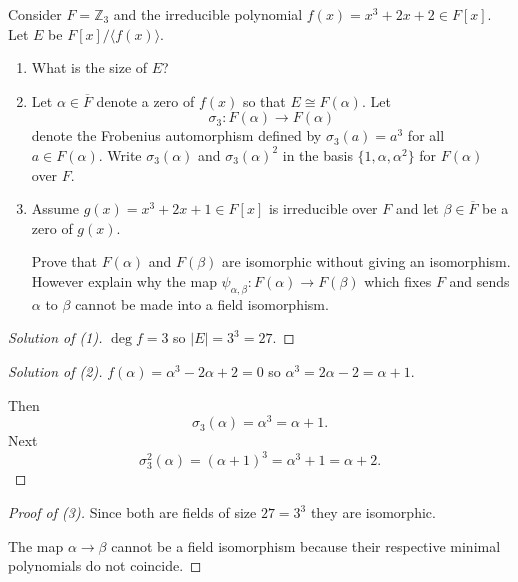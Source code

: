 \begin{prob}
    Consider $F = \mathbb Z_3$ and the irreducible polynomial 
    $f(x) = x^3 + 2x + 2 \in F[x]$.
    Let $E$ be $F[x]/\langle f(x) \rangle$.
    \begin{enumerate}
        \item What is the size of $E$?
        \item Let $\alpha \in \overline F$ denote a zero of 
            $f(x)$ so that $E \cong F(\alpha)$. Let 
            \[
                \sigma_3 : F(\alpha) \to F(\alpha)
            \]
            denote the Frobenius automorphism defined by 
            $\sigma_3(a) = a^3$ for all $a \in F(\alpha)$.
            Write $\sigma_3(\alpha)$ and $\sigma_3(\alpha)^2$ in the 
            basis $\{1,\alpha,\alpha^2\}$ for $F(\alpha)$ over 
            $F$.
        \item Assume $g(x) = x^3 + 2x + 1 \in F[x]$ is irreducible 
            over $F$ and let $\beta \in \overline F$ be a zero of 
            $g(x)$.

            Prove that $F(\alpha)$ and $F(\beta)$ are isomorphic 
            without giving an isomorphism. However explain why 
            the map $\psi_{\alpha,\beta} : F(\alpha) \to F(\beta)$
            which fixes $F$ and sends $\alpha$ to $\beta$ cannot 
            be made into a field isomorphism.
    \end{enumerate}

\end{prob}
\begin{proof}[Solution of (1)]
    $\deg f = 3$ so $|E| = 3^3 = 27$.
\end{proof}
\begin{proof}[Solution of (2)]  
    $f(\alpha) = \alpha^3 - 2 \alpha + 2 = 0$ so 
    $\alpha^3 = 2\alpha - 2 = \alpha + 1$.

    Then 
    \[
        \sigma_3(\alpha) = \alpha^3 = \alpha + 1.
    \]
    Next 
    \[
        \sigma_3^2(\alpha) = (\alpha + 1)^3 = \alpha^3 + 1 
        = \alpha + 2.
    \]
\end{proof}
\begin{proof}[Proof of (3)]
    Since both are fields of size $27 = 3^3$ they are isomorphic.  

    The map $\alpha \to \beta$ cannot be a field isomorphism because 
    their respective minimal polynomials do not coincide.
\end{proof}

